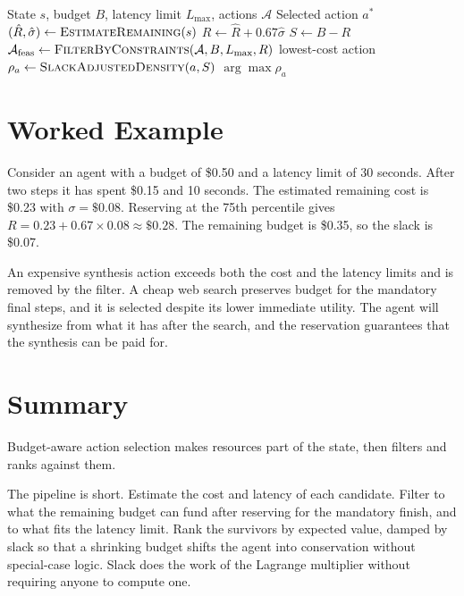 \documentclass[11pt]{book}
\begin{document}
\begin{algorithm}
\caption{Budget-Aware Action Selection Pipeline}
\begin{algorithmic}[1]
\Require State $s$, budget $B$, latency limit $L_{\max}$, actions $\mathcal{A}$
\Ensure Selected action $a^*$
\State $(\hat{R}, \hat{\sigma}) \gets \textsc{EstimateRemaining}(s)$
\State $R \gets \hat{R} + 0.67 \hat{\sigma}$
\State $S \gets B - R$
\State $\mathcal{A}_{\text{feas}} \gets \textsc{FilterByConstraints}(\mathcal{A}, B, L_{\max}, R)$
    \State \Return lowest-cost action
\EndIf
{}
    \State $\rho_a \gets \textsc{SlackAdjustedDensity}(a, S)$
\EndFor
\State \Return $\arg\max \rho_a$
\end{algorithmic}
\end{algorithm}

\section{Worked Example}

Consider an agent with a budget of \$0.50 and a latency limit of 30 seconds. After two steps it has spent \$0.15 and 10 seconds. The estimated remaining cost is \$0.23 with $\sigma = \$0.08$. Reserving at the 75th percentile gives $R = 0.23 + 0.67 \times 0.08 \approx \$0.28$. The remaining budget is \$0.35, so the slack is \$0.07.

An expensive synthesis action exceeds both the cost and the latency limits and is removed by the filter. A cheap web search preserves budget for the mandatory final steps, and it is selected despite its lower immediate utility. The agent will synthesize from what it has after the search, and the reservation guarantees that the synthesis can be paid for.

\section{Summary}

Budget-aware action selection makes resources part of the state, then filters and ranks against them.

The pipeline is short. Estimate the cost and latency of each candidate. Filter to what the remaining budget can fund after reserving for the mandatory finish, and to what fits the latency limit. Rank the survivors by expected value, damped by slack so that a shrinking budget shifts the agent into conservation without special-case logic. Slack does the work of the Lagrange multiplier without requiring anyone to compute one.
\end{document}

